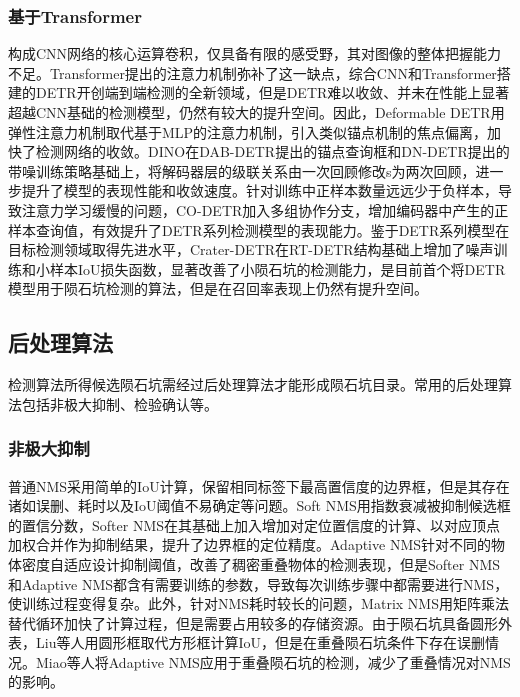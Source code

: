 \subsubsection{基于Transformer}
构成CNN网络的核心运算卷积，仅具备有限的感受野，其对图像的整体把握能力不足。Transformer提出的注意力机制\cite{vaswaniAttentionAllYou2017}弥补了这一缺点，综合CNN和Transformer搭建的DETR\cite{carionEndtoendObjectDetection2020}开创端到端检测的全新领域，但是DETR难以收敛、并未在性能上显著超越CNN基础的检测模型，仍然有较大的提升空间。因此，Deformable DETR\cite{zhuDeformableDETRDeformable2021}用弹性注意力机制取代基于MLP的注意力机制，引入类似锚点机制的焦点偏离，加快了检测网络的收敛。DINO\cite{zhangDINODETRImproved2023}在DAB-DETR\cite{liuDABDETRDynamicAnchor2022}提出的锚点查询框和DN-DETR\cite{liDNDETRAccelerateDETR}提出的带噪训练策略基础上，将解码器层的级联关系由一次回顾修改s为两次回顾，进一步提升了模型的表现性能和收敛速度。针对训练中正样本数量远远少于负样本，导致注意力学习缓慢的问题，CO-DETR\cite{zongDETRsCollaborativeHybrid2023}加入多组协作分支，增加编码器中产生的正样本查询值，有效提升了DETR系列检测模型的表现能力。鉴于DETR系列模型在目标检测领域取得先进水平，Crater-DETR\cite{guoCraterDETRNovelTransformer2024}在RT-DETR\cite{zhaoDETRsBeatYOLOs2024}结构基础上增加了噪声训练和小样本IoU损失函数，显著改善了小陨石坑的检测能力，是目前首个将DETR模型用于陨石坑检测的算法，但是在召回率表现上仍然有提升空间。
\subsection{后处理算法}
检测算法所得候选陨石坑需经过后处理算法才能形成陨石坑目录。常用的后处理算法包括非极大抑制、检验确认等。
\subsubsection{非极大抑制}
普通NMS采用简单的IoU计算，保留相同标签下最高置信度的边界框，但是其存在诸如误删、耗时以及IoU阈值不易确定等问题。Soft NMS\cite{bodlaSoftNMSImprovingObject2017}用指数衰减被抑制候选框的置信分数，Softer NMS\cite{heSofterNMSRethinkingBounding2018}在其基础上加入增加对定位置信度的计算、以对应顶点加权合并作为抑制结果，提升了边界框的定位精度。Adaptive NMS\cite{liuAdaptiveNMSRefining2019}针对不同的物体密度自适应设计抑制阈值，改善了稠密重叠物体的检测表现，但是Softer NMS和Adaptive NMS都含有需要训练的参数，导致每次训练步骤中都需要进行NMS，使训练过程变得复杂。此外，针对NMS耗时较长的问题，Matrix NMS\cite{wangSOLOSimpleFramework2021}用矩阵乘法替代循环加快了计算过程，但是需要占用较多的存储资源。由于陨石坑具备圆形外表，Liu\cite{liuIdentificationLunarCraters2024}等人用圆形框取代方形框计算IoU，但是在重叠陨石坑条件下存在误删情况。Miao\cite{miaoLCDNetInnovativeNeural2024}等人将Adaptive NMS应用于重叠陨石坑的检测，减少了重叠情况对NMS的影响。

